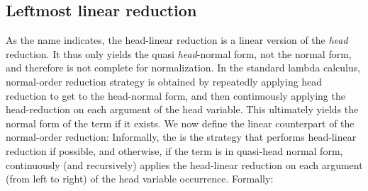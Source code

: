\documentclass{elsarticle}
\theoremstyle{plain}
\theoremstyle{definition}
\theoremstyle{remark}
\begin{document}
\subsection{Leftmost linear reduction}

As the name indicates, the head-linear reduction is a linear version of the
\emph{head} reduction. It thus only yields the quasi \emph{head}-normal form,
not the normal form, and therefore is not complete for normalization.
In the standard lambda calculus, normal-order reduction strategy is obtained by repeatedly applying head reduction to get to the head-normal form,
 and then continuously applying the head-reduction on each argument of the head variable.
This ultimately yields the normal form of the term if it exists.
We now define the linear counterpart of the normal-order reduction: Informally,
 the  is the strategy that performs
 head-linear reduction if possible, and otherwise, if the term is in quasi-head
  normal form, continuously (and recursively) applies the head-linear reduction
  on each argument (from left to right) of the head variable occurrence.
Formally:
\end{document}
